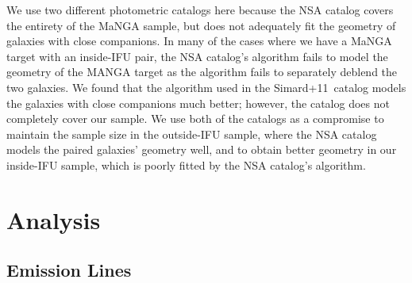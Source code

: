 \documentclass[iop,revtex4,twocolumn,apj,numberedappendix,appendixfloats]{emulateapj}
\newcommand{\simard}{Simard+11}
\begin{document}
We use two different photometric catalogs here because the NSA catalog covers the entirety of the MaNGA sample, but does not adequately fit the geometry of galaxies with close companions. In many of the cases where we have a MaNGA target with an inside-IFU pair, the NSA catalog's algorithm fails to model the geometry of the MANGA target as the algorithm fails to separately deblend the two galaxies. We found that the algorithm used in the \simard\ catalog models the galaxies with close companions much better; however, the catalog does not completely cover our sample. We use both of the catalogs as a compromise to maintain the sample size in the outside-IFU sample, where the NSA catalog models the paired galaxies' geometry well, and to obtain better geometry in our inside-IFU sample, which is poorly fitted by the NSA catalog's algorithm. 

\section{Analysis}\label{sec:analysis}
\subsection{Emission Lines}
\end{document}
